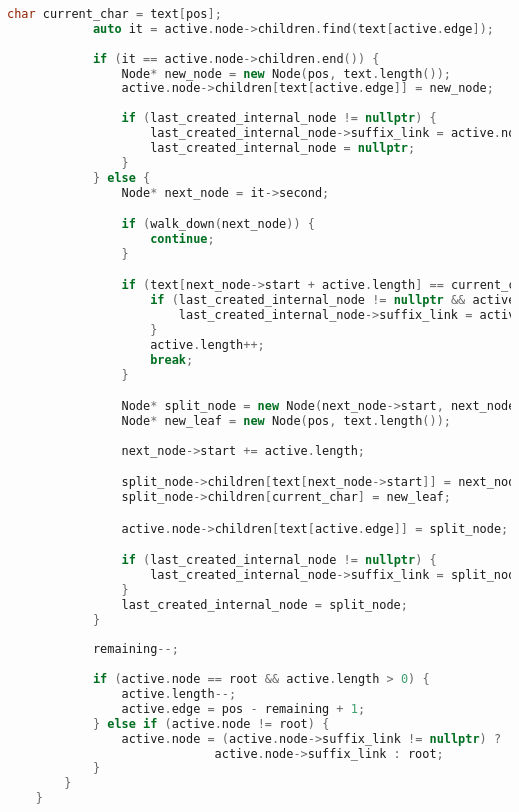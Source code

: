 \begin{lstlisting}[language=C++]
            char current_char = text[pos];
            auto it = active.node->children.find(text[active.edge]);
            
            if (it == active.node->children.end()) {
                Node* new_node = new Node(pos, text.length());
                active.node->children[text[active.edge]] = new_node;
                
                if (last_created_internal_node != nullptr) {
                    last_created_internal_node->suffix_link = active.node;
                    last_created_internal_node = nullptr;
                }
            } else {
                Node* next_node = it->second;

                if (walk_down(next_node)) {
                    continue;
                }

                if (text[next_node->start + active.length] == current_char) {
                    if (last_created_internal_node != nullptr && active.node != root) {
                        last_created_internal_node->suffix_link = active.node;
                    }
                    active.length++;
                    break;
                }

                Node* split_node = new Node(next_node->start, next_node->start + active.length);
                Node* new_leaf = new Node(pos, text.length());
                
                next_node->start += active.length;

                split_node->children[text[next_node->start]] = next_node;
                split_node->children[current_char] = new_leaf;

                active.node->children[text[active.edge]] = split_node;

                if (last_created_internal_node != nullptr) {
                    last_created_internal_node->suffix_link = split_node;
                }
                last_created_internal_node = split_node;
            }
            
            remaining--;
            
            if (active.node == root && active.length > 0) {
                active.length--;
                active.edge = pos - remaining + 1;
            } else if (active.node != root) {
                active.node = (active.node->suffix_link != nullptr) ? 
                             active.node->suffix_link : root;
            }
        }
    }
    

\end{lstlisting}
